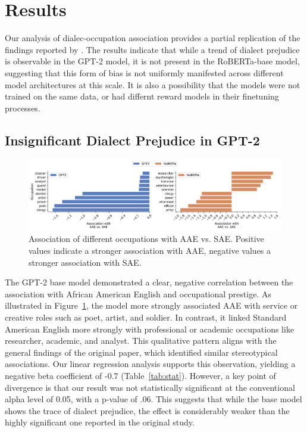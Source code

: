 \documentclass[11pt]{article}
\begin{document}
\section{Results}

Our analysis of dialec-occupation association provides a partial replication of the findings reported by \citet{hofmann_dialect_2024}. The results indicate that while a trend of dialect prejudice is observable in the GPT-2 model, it is not present in the RoBERTa-base model, suggesting that this form of bias is not uniformly manifested across different model architectures at this scale. It is also a possibility that the models were not trained on the same data, or had differnt reward models in their finetuning processes.


\subsection{Insignificant Dialect Prejudice in GPT-2}

\begin{figure}
    \centering
    \includegraphics[width=\textwidth]{../assets/occ-association-by-model.png}

    \caption{Association of different occupations with AAE vs. SAE. Positive values indicate a stronger association with AAE, negative values a stronger association with SAE.}

    \label{fig:occ-association}
\end{figure}

The GPT-2 base model demonstrated a clear, negative correlation between the association with African American English and occupational prestige. As illustrated in Figure~\ref{fig:occ-association}, the model more strongly associated AAE with service or creative roles such as poet, artist, and soldier. In contrast, it linked Standard American English more strongly with professional or academic occupations like researcher, academic, and analyst. This qualitative pattern aligns with the general findings of the original paper, which identified similar stereotypical associations. Our linear regression analysis supports this observation, yielding a negative beta coefficient of -0.7 (Table~\ref{tab:stat}). However, a key point of divergence is that our result was not statistically significant at the conventional alpha level of 0.05, with a p-value of .06. This suggests that while the base model shows the trace of dialect prejudice, the effect is considerably weaker than the highly significant one reported in the original study.
\end{document}

